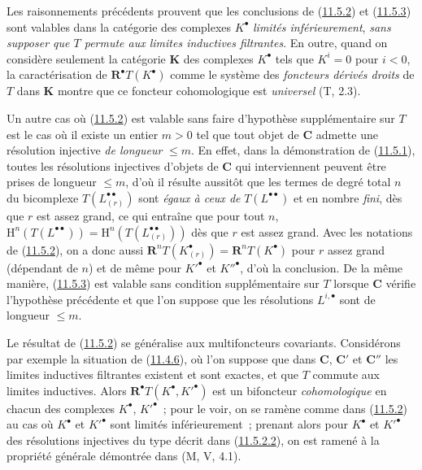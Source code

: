 \begin{remark}[11.5.4]
\label{0.11.5.4-fr}
Les raisonnements précédents prouvent que les conclusions de
(\hyperref[0.11.5.2-fr]{11.5.2}) et
(\hyperref[0.11.5.3-fr]{11.5.3}) sont valables dans la catégorie des
complexes $K^\bullet$ \emph{limités inférieurement}, \emph{sans supposer que $T$
permute aux limites inductives filtrantes}. En outre, quand on considère
seulement la catégorie $\boldsymbol{K}$ des complexes $K^\bullet$ tels que
$K^i=0$ pour $i<0$, la caractérisation de $\mathbf R^\bullet T(K^\bullet)$
comme le système des \emph{foncteurs dérivés droits} de $T$ dans $\boldsymbol{K}$
montre que ce foncteur cohomologique est \emph{universel} (T, 2.3).

Un autre cas où (\hyperref[0.11.5.2-fr]{11.5.2}) est valable sans faire
d'hypothèse supplémentaire sur $T$ est le cas où il existe un entier $m>0$
tel que tout objet de $\boldsymbol{C}$ admette une résolution injective \emph{de longueur}
$\leq m$. En effet, dans la démonstration de
(\hyperref[0.11.5.1-fr]{11.5.1}), toutes les résolutions injectives d'objets
de $\boldsymbol{C}$ qui interviennent peuvent être prises de longueur $\leq m$,
d'où il résulte aussitôt que les termes de degré total $n$ du bicomplexe
$T(L_{(r)}^{\bullet\bullet})$ sont \emph{égaux à ceux de}
$T(L^{\bullet\bullet})$ et en nombre \emph{fini}, dès que $r$ est assez grand, ce qui
entraîne que pour tout $n$,
$\mathrm H^n(T(L^{\bullet\bullet}))=
\mathrm H^n(T(L_{(r)}^{\bullet\bullet}))$ dès que $r$ est assez grand. Avec
les notations de (\hyperref[0.11.5.2-fr]{11.5.2}), on a donc aussi
$\mathbf R^nT(K_{(r)}^\bullet)=\mathbf R^nT(K^\bullet)$ pour $r$ assez grand
(dépendant de $n$) et de même pour $K'^\bullet$ et $K''^\bullet$, d'où la
conclusion. De la même manière, (\hyperref[0.11.5.3-fr]{11.5.3}) est valable
sans condition supplémentaire sur $T$ lorsque $\boldsymbol{C}$ vérifie
l'hypothèse précédente et que l'on suppose que les résolutions
$L^{i,\bullet}$ sont de longueur $\leq m$.
\end{remark}

\begin{env}[11.5.5]
\label{0.11.5.5-fr}
Le résultat de (\hyperref[0.11.5.2-fr]{11.5.2}) se généralise aux
multifoncteurs covariants. Considérons par exemple la situation de
(\hyperref[0.11.4.6-fr]{11.4.6}), où l'on suppose que dans $\boldsymbol{C}$,
$\boldsymbol{C}'$ et $\boldsymbol{C}''$
les limites inductives filtrantes existent et sont exactes, et que $T$ commute
aux limites inductives. Alors $\mathbf R^\bullet T(K^\bullet,K'^\bullet)$ est
un bifoncteur \emph{cohomologique} en chacun des complexes $K^\bullet$,
$K'^\bullet$~; pour le voir, on se ramène comme dans
(\hyperref[0.11.5.2-fr]{11.5.2}) au cas où $K^\bullet$ et $K'^\bullet$ sont
limités inférieurement~; prenant alors pour $K^\bullet$ et $K'^\bullet$ des
résolutions injectives du type décrit dans
(\hyperref[0.11.5.2.2-fr]{11.5.2.2}), on est ramené à la propriété générale
démontrée dans (M, V, 4.1).
\end{env}

